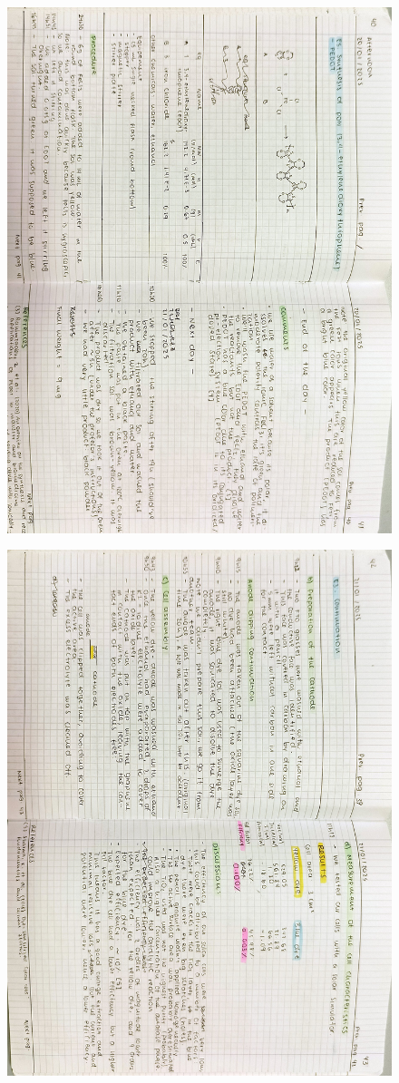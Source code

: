 \begin{figure}[H]
	\centering
	\includegraphics[width=0.6\linewidth, angle=90]{../images/compressed/IMG20250123173107.jpg}
\end{figure}
\begin{figure}[H]
	\centering
	\includegraphics[width=0.6\linewidth, angle=90]{../images/compressed/IMG20250123173112.jpg}
\end{figure}
